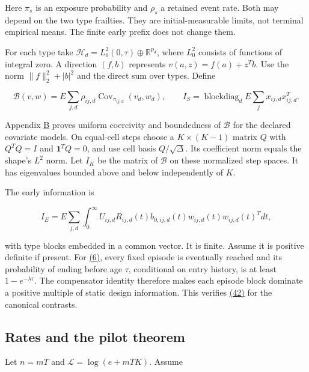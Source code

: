 \documentclass[11pt]{article}
\begin{document}
Here \(\pi_s\) is an exposure probability and \(\rho_s\) a retained event rate. Both may depend on the two type frailties. They are initial-measurable limits, not terminal empirical means. The finite early prefix does not change them.

For each type take \(\mathcal H_d=L_0^2(0,\tau)\oplus\mathbb R^{p_d}\), where \(L_0^2\) consists of functions of integral zero. A direction \((f,b)\) represents \(v(a,z)=f(a)+z^Tb\). Use the norm \(\|f\|_2^2+|b|^2\) and the direct sum over types. Define

\begin{equation*}
\mathcal B(v,w)=E\sum_{j,d}\rho_{ij,d}
       \operatorname{Cov}_{\pi_{ij,d}}(v_d,w_d),\qquad
I_S=\operatorname{blockdiag}_d E\sum_j x_{ij,d}x_{ij,d}^T .
\tag{41}\label{eq:41}
\end{equation*}

Appendix \hyperref[sec:B]{B} proves uniform coercivity and boundedness of \(\mathcal B\) for the declared covariate models. On equal-cell steps choose a \(K\times(K-1)\) matrix \(Q\) with \(Q^TQ=I\) and \(\mathbf1^TQ=0\), and use cell basis \(Q/\sqrt\Delta\). Its coefficient norm equals the shape's \(L^2\) norm. Let \(I_K\) be the matrix of \(\mathcal B\) on these normalized step spaces. It has eigenvalues bounded above and below independently of \(K\).

The early information is

\begin{equation*}
I_E=E\sum_{j,d}\int_0^\infty
 U_{ij,d}R_{ij,d}(t)b_{0,ij,d}(t)w_{ij,d}(t)w_{ij,d}(t)^Tdt,
\tag{42}\label{eq:42}
\end{equation*}

with type blocks embedded in a common vector. It is finite. Assume it is positive definite if present. For \hyperref[eq:6]{(6)}, every fixed episode is eventually reached and its probability of ending before age \(\tau\), conditional on entry history, is at least \(1-e^{-\underline\lambda\tau}\). The compensator identity therefore makes each episode block dominate a positive multiple of static design information. This verifies \hyperref[eq:42]{(42)} for the canonical contrasts.

\subsection{Rates and the pilot theorem}\label{sec:4.2}

Let \(n=mT\) and \(\mathscr L=\log(e+mTK)\). Assume
\end{document}
